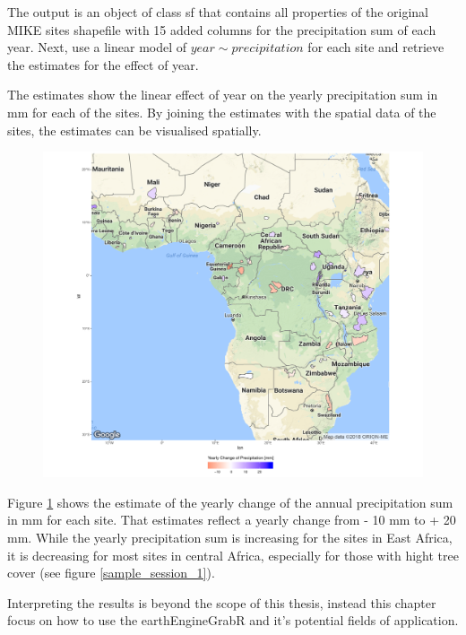 The output is an object of class sf that contains all properties of the original MIKE sites shapefile with 15 added columns for the precipitation sum of each year.
Next, use a linear model of $year  \sim precipitation$ for each site and retrieve the estimates for the effect of year. 

The estimates show the linear effect of year on the yearly precipitation sum in mm for each of the sites. 
By joining the estimates with the spatial data of the sites, the estimates can be visualised spatially. 

\begin{center}
	\begin{figure}[h]
		\begin{center}
			\includegraphics[width=16cm]{images/change_precipitation.pdf}
			\label{change}
		\end{center}
	\end{figure}
\end{center}


Figure \ref{change} shows the estimate of the yearly change of the annual precipitation sum in mm for each site. That estimates reflect a yearly change from - 10 mm to + 20 mm. While the yearly precipitation sum is increasing for the sites in East Africa, it is decreasing for most sites in central Africa, especially for those with hight tree cover (see figure \ref*{sample_session_1}).


Interpreting the results is beyond the scope of this thesis, instead this chapter focus on how to use the earthEngineGrabR and it's potential fields of application.





